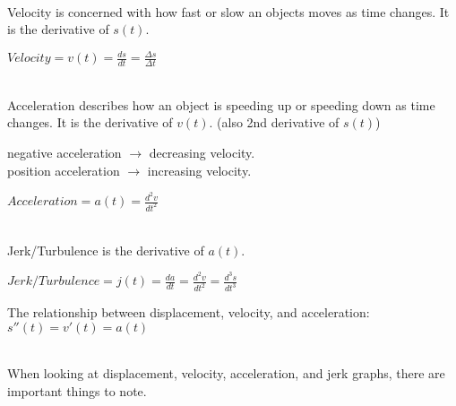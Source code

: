 \documentclass[12pt,fleqn]{book} %
\begin{document}
\vspace*{2mm}

 \\
Velocity is concerned with how fast or slow an objects moves as time changes. It is the derivative of $s(t)$.

\begin{center}
    {\large $Velocity = v(t) = \frac{ds}{dt} = \frac{\Delta s}{\Delta t}$}

\end{center}

\vspace*{2mm}

 \\
Acceleration describes how an object is speeding up or speeding down as time changes. It is the derivative of $v(t)$. (also 2nd derivative of $s(t)$)

\begin{center}
    negative acceleration $\to$ decreasing velocity. \\
    position acceleration $\to$ increasing velocity.
\end{center}

\begin{center}
    {\large $Acceleration = a(t) = \frac{d^2v}{dt^2}$}

\end{center}

\vspace*{2mm}

 \\
Jerk/Turbulence is the derivative of $a(t)$.

\begin{center}
    {\large $Jerk/Turbulence = j(t) = \frac{da}{dt} = \frac{d^2v}{dt^2} = \frac{d^3s}{dt^3}$}
\end{center}

\vspace*{2mm}

\begin{center}
    The relationship between displacement, velocity, and acceleration: \\
    \vspace*{2mm}
    {\large $s''(t) = v'(t) = a(t)$}
\end{center}

 \\
When looking at displacement, velocity, acceleration, and jerk graphs, there are important things to note.
\end{document}
